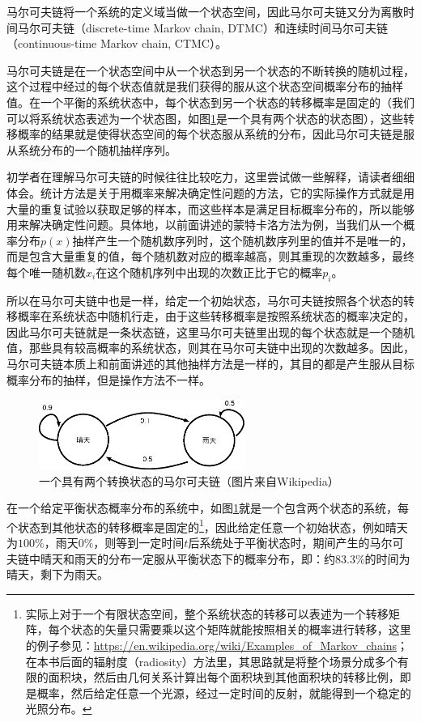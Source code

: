 马尔可夫链将一个系统的定义域当做一个状态空间，因此马尔可夫链又分为离散时间马尔可夫链（discrete-time Markov chain, DTMC）和连续时间马尔可夫链（continuous-time Markov chain, CTMC）。

马尔可夫链是在一个状态空间中从一个状态到另一个状态的不断转换的随机过程，这个过程中经过的每个状态值就是我们获得的服从这个状态空间概率分布的抽样值。在一个平衡的系统状态中，每个状态到另一个状态的转移概率是固定的（我们可以将系统状态表述为一个状态图，如图\ref{f:mc-markov-chain}是一个具有两个状态的状态图），这些转移概率的结果就是使得状态空间的每个状态服从系统的分布，因此马尔可夫链是服从系统分布的一个随机抽样序列。

初学者在理解马尔可夫链的时候往往比较吃力，这里尝试做一些解释，请读者细细体会。统计方法是关于用概率来解决确定性问题的方法，它的实际操作方式就是用大量的重复试验以获取足够的样本，而这些样本是满足目标概率分布的，所以能够用来解决确定性问题。具体地，以前面讲述的蒙特卡洛方法为例，当我们从一个概率分布$p(x)$抽样产生一个随机数序列时，这个随机数序列里的值并不是唯一的，而是包含大量重复的值，每个随机数对应的概率越高，则其重现的次数越多，最终每个唯一随机数$x_i$在这个随机序列中出现的次数正比于它的概率$p_i$。

所以在马尔可夫链中也是一样，给定一个初始状态，马尔可夫链按照各个状态的转移概率在系统状态中随机行走，由于这些转移概率是按照系统状态的概率决定的，因此马尔可夫链就是一条状态链，这里马尔可夫链里出现的每个状态就是一个随机值，那些具有较高概率的系统状态，则其在马尔可夫链中出现的次数越多。因此，马尔可夫链本质上和前面讲述的其他抽样方法是一样的，其目的都是产生服从目标概率分布的抽样，但是操作方法不一样。

\begin{figure}
	\sidecaption
	\includegraphics[width=0.6\textwidth]{figures/mc/markov-chain-example}
	\caption{一个具有两个转换状态的马尔可夫链（图片来自Wikipedia）}
	\label{f:mc-markov-chain}
\end{figure}

在一个给定平衡状态概率分布的系统中，如图\ref{f:mc-markov-chain}就是一个包含两个状态的系统，每个状态到其他状态的转移概率是固定的\footnote{实际上对于一个有限状态空间，整个系统状态的转移可以表述为一个转移矩阵，每个状态的矢量只需要乘以这个矩阵就能按照相关的概率进行转移，这里的例子参见：\url{https://en.wikipedia.org/wiki/Examples_of_Markov_chains}；在本书后面的辐射度（radiosity）方法里，其思路就是将整个场景分成多个有限的面积块，然后由几何关系计算出每个面积块到其他面积块的转移比例，即是概率，然后给定任意一个光源，经过一定时间的反射，就能得到一个稳定的光照分布。}，因此给定任意一个初始状态，例如晴天为$100\%$，雨天$0\%$，则等到一定时间$t$后系统处于平衡状态时，期间产生的马尔可夫链中晴天和雨天的分布一定服从平衡状态下的概率分布，即：约$83.3\%$的时间为晴天，剩下为雨天。

